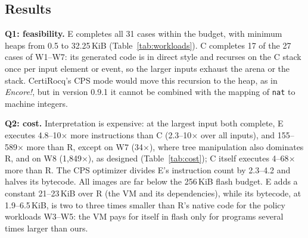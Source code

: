 \documentclass[runningheads]{llncs}
\newcommand{\encore}{\textit{Encore!}}
\newcommand{\code}[1]{\texttt{#1}}
\begin{document}
\begin{table}
\centering
\caption{Cost (Q2) at the largest $N$ that both E and C complete (W8: largest $N$, C not built). Instructions executed per run on the Cortex-M33; flash of the linked image, and E's bytecode.}
\label{tab:cost}
\end{table}

\subsection{Results}

\textbf{Q1: feasibility.}
E completes all 31 cases within the budget, with minimum heaps from 0.5 to 32.25\,KiB (Table~\ref{tab:workloads}).
C completes 17 of the 27 cases of W1--W7: its generated code is in direct style and recurses on the C stack once per input element or event, so the larger inputs exhaust the arena or the stack.
CertiRocq's CPS mode would move this recursion to the heap, as in \encore{}, but in version 0.9.1 it cannot be combined with the mapping of \code{nat} to machine integers.

\textbf{Q2: cost.}
Interpretation is expensive: at the largest input both complete, E executes 4.8--10$\times$ more instructions than C (2.3--10$\times$ over all inputs), and 155--589$\times$ more than R, except on W7 (34$\times$), where tree manipulation also dominates R, and on W8 (1{,}849$\times$), as designed (Table~\ref{tab:cost}); C itself executes 4--68$\times$ more than R.
The CPS optimizer divides E's instruction count by 2.3--4.2 and halves its bytecode.
All images are far below the 256\,KiB flash budget.
E adds a constant 21--23\,KiB over R (the VM and its dependencies), while its bytecode, at 1.9--6.5\,KiB, is two to three times smaller than R's native code for the policy workloads W3--W5: the VM pays for itself in flash only for programs several times larger than ours.
\end{document}
